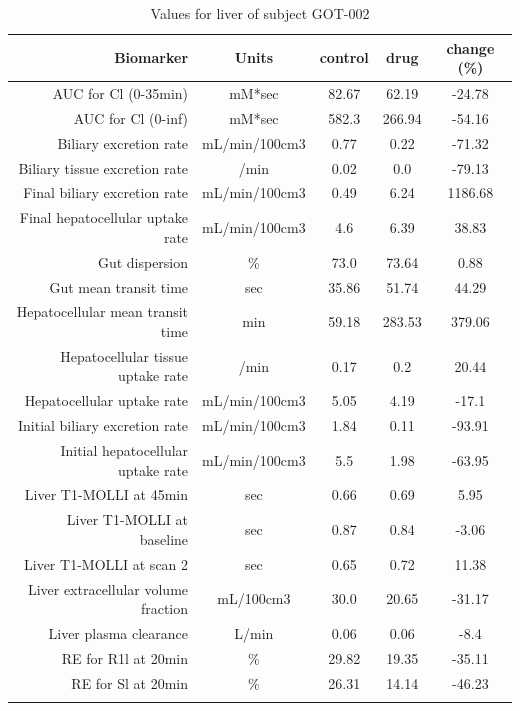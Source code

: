 \documentclass{epflreport}%
\begin{document}
%
\clearpage%
\begin{longtable}{rcccc}%
\hline%
Biomarker&Units&control&drug&change (\%)\\%
\hline%
AUC for Cl (0{-}35min)&mM*sec&82.67&62.19&{-}24.78\\%
AUC for Cl (0{-}inf)&mM*sec&582.3&266.94&{-}54.16\\%
Biliary excretion rate&mL/min/100cm3&0.77&0.22&{-}71.32\\%
Biliary tissue excretion rate&/min&0.02&0.0&{-}79.13\\%
Final biliary excretion rate&mL/min/100cm3&0.49&6.24&1186.68\\%
Final hepatocellular uptake rate&mL/min/100cm3&4.6&6.39&38.83\\%
Gut dispersion&\%&73.0&73.64&0.88\\%
Gut mean transit time&sec&35.86&51.74&44.29\\%
Hepatocellular mean transit time&min&59.18&283.53&379.06\\%
Hepatocellular tissue uptake rate&/min&0.17&0.2&20.44\\%
Hepatocellular uptake rate&mL/min/100cm3&5.05&4.19&{-}17.1\\%
Initial biliary excretion rate&mL/min/100cm3&1.84&0.11&{-}93.91\\%
Initial hepatocellular uptake rate&mL/min/100cm3&5.5&1.98&{-}63.95\\%
Liver T1{-}MOLLI at 45min&sec&0.66&0.69&5.95\\%
Liver T1{-}MOLLI at baseline&sec&0.87&0.84&{-}3.06\\%
Liver T1{-}MOLLI at scan 2&sec&0.65&0.72&11.38\\%
Liver extracellular volume fraction&mL/100cm3&30.0&20.65&{-}31.17\\%
Liver plasma clearance&L/min&0.06&0.06&{-}8.4\\%
RE for R1l at 20min&\%&29.82&19.35&{-}35.11\\%
RE for Sl at 20min&\%&26.31&14.14&{-}46.23\\%
\hline%
\caption{Values for liver of subject GOT-002} \\%
\end{longtable}%
\end{document}
